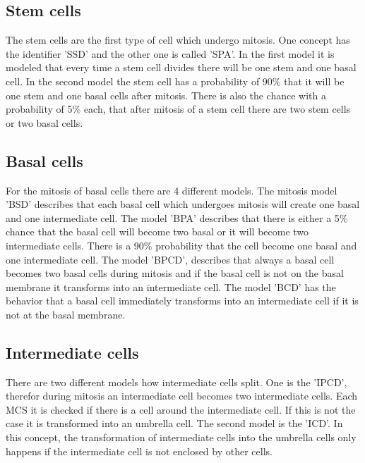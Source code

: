 \subsection{Stem cells}
The stem cells are the first type of cell which undergo mitosis. One concept has the identifier 'SSD' and the other one is called 'SPA'. In the first model it is modeled that every time a stem cell divides there will be one stem and one basal cell. In the second model the stem cell has a probability of 90\% that it will be one stem and one basal cells after mitosis. There is also the chance with a probability of 5\% each, that after mitosis of a stem cell there are two stem cells or two basal cells.
\subsection{Basal cells}
For the mitosis of basal cells there are 4 different models. The mitosis model 'BSD' describes that each basal cell which undergoes mitosis will create one basal and one intermediate cell. The model 'BPA' describes that there is either a 5\% chance that the basal cell will become two basal or it will become two intermediate cells. There is a 90\% probability that the cell become one basal and one intermediate cell. The model 'BPCD', describes that always a basal cell becomes two basal cells during mitosis and if the basal cell is not on the basal membrane it transforms into an intermediate cell. The model 'BCD' has the behavior that a basal cell immediately transforms into an intermediate cell if it is not at the basal membrane.\newline
\subsection{Intermediate cells}
There are two different models how intermediate cells split. One is the 'IPCD', therefor during mitosis an intermediate cell becomes two intermediate cells. Each \ac{MCS} it is checked if there is a cell around the intermediate cell. If this is not the case it is transformed into an umbrella cell. The second model is the 'ICD'. In this concept, the transformation of intermediate cells into the umbrella cells only happens if the intermediate cell is not enclosed by other cells. \newline


